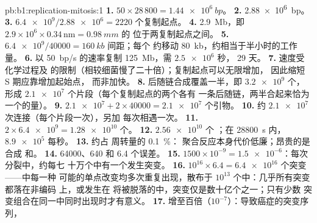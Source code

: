 \begin{solution}{pb:b1:replication-mitosis:1}
\textbf{1.} $50\times 28\,800 = \qty{1.44e6}{bp}$。
\textbf{2.} \qty{2.88e6}{bp}。
\textbf{3.} $\num{6.4e9}/\num{2.88e6} = 2220$ 个复制起点。
\textbf{4.} \qty{2.9}{Mb}，即 $2.9\times 10^6\times 0.34\,\mathrm{nm} =
\qty{0.98}{mm}$ 的  位于两复制起点之间。
\textbf{5.} $\num{6.4e9}/\num{40000} = \qty{160}{kb}$ 间距；每个
约移动 \qty{80}{kb}，约相当于半小时的工作量。
\textbf{6.} 以 \qty{50}{bp/s} 的速率复制 \qty{125}{Mb}，需 $\num{2.5e6}$ 秒，
29 天。
\textbf{7.} 速度受化学过程及
的限制（相较细菌慢了二十倍）；复制起点可以无限增加，
因此缩短 S 期应靠增加起始点，
而非加快。
\textbf{8.} 后随链合成覆盖一半，即 $\num{3.2e9}$
个，形成 $\num{2.1e7}$ 个片段（每个复制起点的两个各有
一条后随链，两半合起来恰为一个的量）。
\textbf{9.} $\num{2.1e7} + 2\times\num{40000} = \num{2.1e7}$ 个引物。
\textbf{10.} 约 $\num{2.1e7}$ 次连接（每个片段一次），另加
每次相遇一次。
\textbf{11.} $2\times\num{6.4e9} = \num{1.28e10}$ 个。
\textbf{12.} $\num{2.56e10}$ 个 ；在 \qty{28800}{s} 内，$\num{8.9e5}$
每秒。
\textbf{13.} 约占  周转量的 \qty{0.1}{\%}：
聚合反应本身代价低廉；昂贵的是合成
和。
\textbf{14.} \num{64000}、640 和 6.4 个误差。
\textbf{15.} $1500\times 10^{-9} = \num{1.5e-6}$：每次分裂中，约每七
十万个中有一个发生突变。
\textbf{16.} $10^{16}\times 6.4 = \num{6.4e16}$ 个突变——中每一种
可能的单点改变均多次重复出现，散布于
$10^{13}$ 个中：几乎所有突变都落在非编码  上，或发生在
将被脱落的中，突变仅是数十亿个之一；只有少数
突变组合在同一中同时出现时才有意义。
\textbf{17.} 增至百倍（$10^{-7}$）：导致癌症的突变序列，

\end{solution}
